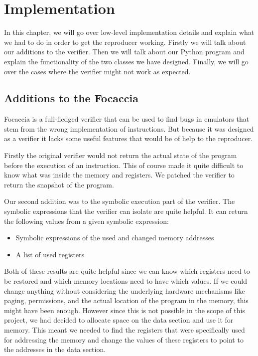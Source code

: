 
\chapter{Implementation}\label{chapter:implementation}
In this chapter, we will go over low-level implementation details and explain what we had to do in order to get the reproducer working.
Firstly we will talk about our additions to the verifier.
Then we will talk about our Python program and explain the functionality of the two classes we have designed.
Finally, we will go over the cases where the verifier might not work as expected.

\section{Additions to the Focaccia}
Focaccia is a full-fledged verifier that can be used to find bugs in emulators that stem from the wrong implementation of instructions.
But because it was designed as a verifier it lacks some useful features that would be of help to the reproducer.

Firstly the original verifier would not return the actual state of the program before the execution of an instruction.
This of course made it quite difficult to know what was inside the memory and registers.
We patched the verifier to return the snapshot of the program.

Our second addition was to the symbolic execution part of the verifier.
The symbolic expressions that the verifier can isolate are quite helpful.
It can return the following values from a given symbolic expression:
\begin{itemize}
    \item Symbolic expressions of the used and changed memory addresses
    \item A list of used registers
\end{itemize}
Both of these results are quite helpful since we can know which registers need to be restored and which memory locations need to have which values.
If we could change anything without considering the underlying hardware mechanisms like paging, permissions, and the actual location of the program in the memory, this might have been enough.
However since this is not possible in the scope of this project, we had decided to allocate space on the data section and use it for memory.
This meant we needed to find the registers that were specifically used for addressing the memory and change the values of these registers to point to the addresses in the data section.

